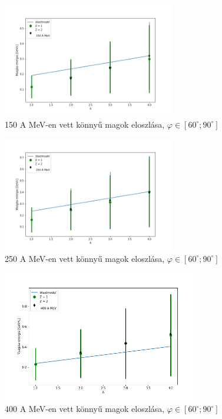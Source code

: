 \documentclass[a4paper,12pt]{article}
\begin{document}
\begin{figure}[H]
\begin{minipage}{\textwidth}
\centering
\includegraphics[width=0.67\textwidth]{./konnyu_magok_150AMeV.png}
\caption{150 A MeV-en vett könnyű magok eloszlása, $\varphi \in [60^{\circ};90^{\circ}]$}
\end{minipage}
\end{figure}
\begin{figure}[H]
\begin{minipage}{\textwidth}
\centering
\includegraphics[width=0.67\textwidth]{./konnyu_magok_250AMeV.png}
\caption{250 A MeV-en vett könnyű magok eloszlása, $\varphi \in [60^{\circ};90^{\circ}]$}
\end{minipage}
\end{figure}
\begin{figure}[H]
\begin{minipage}{\textwidth}
\centering
\includegraphics[width=0.77\textwidth]{./konnyu_magok_400AMeV.png}
\caption{400 A MeV-en vett könnyű magok eloszlása, $\varphi \in [60^{\circ};90^{\circ}]$}
\end{minipage}
\end{figure}
\end{document}
